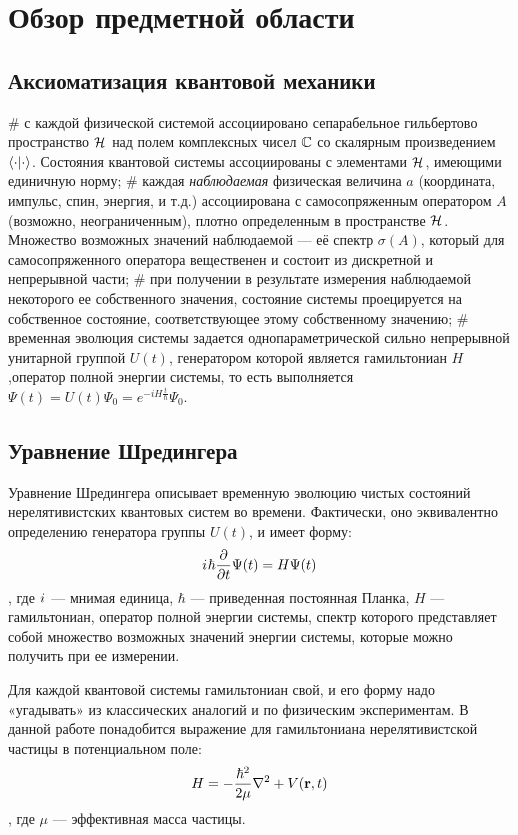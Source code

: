 \chapter{Обзор предметной области}
\label{chapter1}

\section{Аксиоматизация квантовой механики}
\begin{easylist}[itemize]
# с каждой физической системой ассоциировано сепарабельное гильбертово пространство $\mathcal{H}_{}$ над полем комплексных чисел $\mathbb{C}$ со скалярным произведением $\ipcdot$. Состояния квантовой системы ассоциированы с элементами $\mathcal{H}_{}$, имеющими единичную норму;
# каждая \textit{наблюдаемая} физическая величина $a$ (координата, импульс, спин, энергия, и т.д.) ассоциирована с самосопряженным оператором $A$ (возможно, неограниченным), плотно определенным в пространстве $\mathcal{H}_{}$. Множество возможных значений наблюдаемой — её спектр $\sigma(A)$, который для самосопряженного оператора вещественен и состоит из дискретной и непрерывной части;
# при получении в результате измерения наблюдаемой некоторого ее собственного значения, состояние системы проецируется на собственное состояние, соответствующее этому собственному значению;
# временная эволюция системы задается однопараметрической сильно непрерывной унитарной группой $U(t)$, генератором которой является гамильтониан $H$,оператор полной энергии системы, то есть выполняется $\Psi(t) = U(t) \Psi_0 = e^{-i H \frac{t}{\hbar}} \Psi_0$.
\end{easylist}

\section{Уравнение Шредингера}
Уравнение Шредингера описывает временную эволюцию чистых состояний нерелятивистских квантовых систем во времени. Фактически, оно эквивалентно определению генератора группы $U(t)$, и имеет форму:
\[
{i\mkern1mu} \hbar \pdv{t} \Psi(t) = H \Psi(t)
\]
, где ${i\mkern1mu}$ — мнимая единица, $\hbar$ — приведенная постоянная Планка, $H$ — гамильтониан, оператор полной энергии системы, спектр которого представляет собой множество возможных значений энергии системы, которые можно получить при ее измерении.

Для каждой квантовой системы гамильтониан свой, и его форму надо «угадывать» из классических аналогий и по физическим экспериментам. В данной работе понадобится выражение для гамильтониана нерелятивистской частицы в потенциальном поле:
\[
H = - \frac{\hbar^2}{2 \mu} \laplacian + V(\vb{r}, t)
\],
где $\mu$ — эффективная масса частицы.


